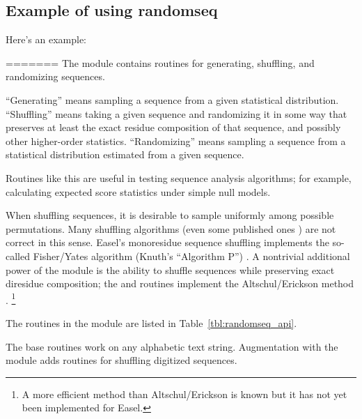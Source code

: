 \subsection{Example of using randomseq}

Here's an example:





=======
The  module contains routines for generating,
shuffling, and randomizing sequences.

``Generating'' means sampling a sequence from a given statistical
distribution. ``Shuffling'' means taking a given sequence and
randomizing it in some way that preserves at least the exact residue
composition of that sequence, and possibly other higher-order
statistics. ``Randomizing'' means sampling a sequence from a
statistical distribution estimated from a given sequence.

Routines like this are useful in testing sequence analysis algorithms;
for example, calculating expected score statistics under simple null
models. 


When shuffling sequences, it is desirable to sample uniformly among
possible permutations. Many shuffling algorithms (even some published
ones \citep{Fitch83}) are not correct in this sense. Easel's
monoresidue sequence shuffling implements the so-called Fisher/Yates
algorithm (Knuth's ``Algorithm P'') \citep{Durstenfeld64,Knu-81a}.  A
nontrivial additional power of the module is the ability to shuffle
sequences while preserving exact diresidue composition; the
 and 
routines implement the Altschul/Erickson method
\citep{AltschulErickson86}. \footnote{A more efficient method than
Altschul/Erickson is known \citep{KandelWinkler96,Coward99} but it has
not yet been implemented for Easel.}

The routines in the module are listed in
Table~\ref{tbl:randomseq_api}.

The base routines work on any alphabetic text string.  Augmentation
with the  module adds routines for shuffling
digitized sequences.


